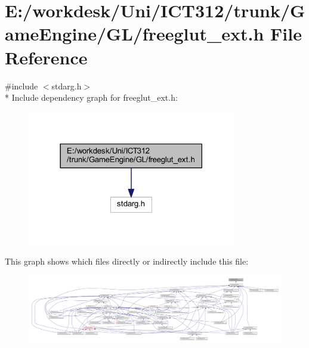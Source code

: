 \section{E\+:/workdesk/\+Uni/\+I\+C\+T312/trunk/\+Game\+Engine/\+G\+L/freeglut\+\_\+ext.h File Reference}
\label{freeglut__ext_8h}
{\ttfamily \#include $<$stdarg.\+h$>$}\\*
Include dependency graph for freeglut\+\_\+ext.\+h\+:\nopagebreak
\begin{figure}[H]
\begin{center}
\leavevmode
\includegraphics[width=258pt]{df/dc0/freeglut__ext_8h__incl}
\end{center}
\end{figure}
This graph shows which files directly or indirectly include this file\+:
\nopagebreak
\begin{figure}[H]
\begin{center}
\leavevmode
\includegraphics[width=350pt]{d3/df8/freeglut__ext_8h__dep__incl}
\end{center}
\end{figure}
